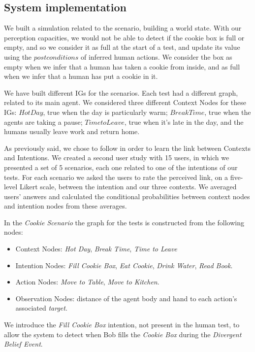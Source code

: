 \subsection{System implementation}
We built a simulation related to the scenario, building a world state. With our perception capacities, we would not be able to detect if the cookie box is full or empty, and so we consider it as full at the start of a test, and update its value using the $postconditions$ of inferred human actions. We consider the box as empty when we infer that a human has taken a cookie from inside, and as full when we infer that a human has put a cookie in it.

We have built different IGs for the scenarios. Each test had a different graph, related to its main agent. We considered three different Context Nodes for these IGs: $Hot Day$, true when the day is particularly warm; $Break Time$, true when the agents are taking a pause; $Time to Leave$, true when it's late in the day, and the humans usually leave work and return home.

As previously said, we chose to follow \cite{Liu2014} in order to learn the link between Contexts and Intentions. We created a second user study with 15 users, in which we presented a set of 5 scenarios, each one related to one of the intentions of our tests. For each scenario we asked the users to rate the perceived link, on a five-level Likert scale, between the intention and our three contexts. We averaged users' answers and calculated the conditional probabilities between context nodes and intention nodes from these averages.


In the \textit{Cookie Scenario} the graph for the tests is constructed from the following nodes:
\begin{itemize}
\item Context Nodes: \textit{Hot Day}, \textit{Break Time}, \textit{Time to Leave}
\item Intention Nodes: \textit{Fill Cookie Box}, \textit{Eat Cookie}, \textit{Drink Water}, \textit{Read Book}.
\item Action Nodes: \textit{Move to Table}, \textit{Move to Kitchen}.
\item Observation Nodes: distance of the agent body and hand to each action's associated \textit{target}.
\end{itemize}

We introduce the \textit{Fill Cookie Box} intention, not present in the human test, to allow the system to detect when Bob fills the \textit{Cookie Box} during the \textit{Divergent Belief Event}.

